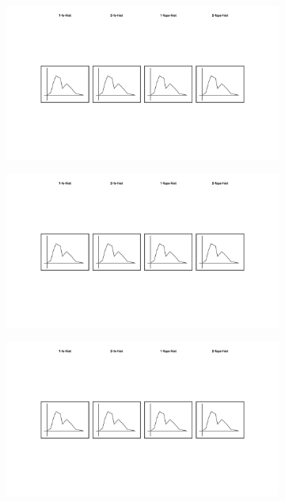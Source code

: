 \begin{figure}
  \centering
  \begin{subfigure}{0.24\textwidth}
    \centering
    \includegraphics[width=\textwidth]{img/1-fs-hist}
  \end{subfigure}
  \begin{subfigure}{0.24\textwidth}
    \centering
    \includegraphics[width=\textwidth]{img/2-fs-hist}
  \end{subfigure}
  \begin{subfigure}{0.24\textwidth}
    \centering
    \includegraphics[width=\textwidth]{img/1-fcps-hist}

\end{subfigure}
\end{figure}

